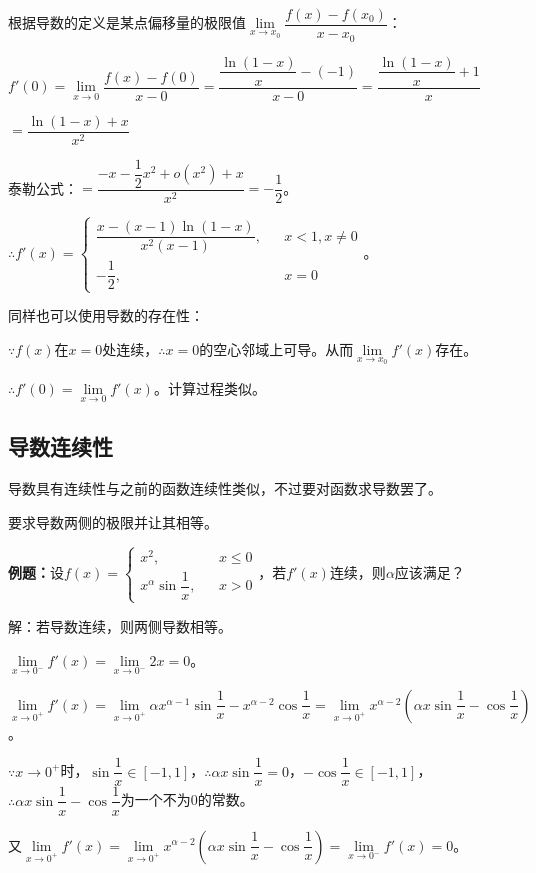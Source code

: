 \documentclass[UTF8, 12pt]{ctexart}
\begin{document}
根据导数的定义是某点偏移量的极限值$\lim\limits_{x\to x_0}\dfrac{f(x)-f(x_0)}{x-x_0}$：

$f'(0)=\lim\limits_{x\to 0}\dfrac{f(x)-f(0)}{x-0}=\dfrac{\dfrac{\ln(1-x)}{x}-(-1)}{x-0}=\dfrac{\dfrac{\ln(1-x)}{x}+1}{x}$\medskip

$=\dfrac{\ln(1-x)+x}{x^2}$

泰勒公式：$=\dfrac{-x-\dfrac{1}{2}x^2+o(x^2)+x}{x^2}=-\dfrac{1}{2}$。\medskip

$\therefore f'(x)=\left\{\begin{array}{lcl}
    \dfrac{x-(x-1)\ln(1-x)}{x^2(x-1)}, & & x<1,x\neq 0 \\
    -\dfrac{1}{2}, & & x=0
\end{array}
\right.$。\medskip

同样也可以使用导数的存在性：

$\because f(x)$在$x=0$处连续，$\therefore x=0$的空心邻域上可导。从而$\lim\limits_{x\to x_0}f'(x)$存在。

$\therefore f'(0)=\lim\limits_{x\to 0}f'(x)$。计算过程类似。

\subsection{导数连续性}

导数具有连续性与之前的函数连续性类似，不过要对函数求导数罢了。

要求导数两侧的极限并让其相等。\medskip

\textbf{例题：}设$f(x)=\left\{\begin{array}{lcl}
    x^2, & & x\leqslant 0 \\
    x^\alpha\sin\dfrac{1}{x}, & & x>0
\end{array}
\right.$，若$f'(x)$连续，则$\alpha$应该满足？ 

解：若导数连续，则两侧导数相等。

$\lim\limits_{x\to 0^-}f'(x)=\lim\limits_{x\to 0^-}2x=0$。

$\lim\limits_{x\to 0^+}f'(x)=\lim\limits_{x\to 0^+}\alpha x^{\alpha-1}\sin\dfrac{1}{x}-x^{\alpha-2}\cos\dfrac{1}{x}=\lim\limits_{x\to 0^+}x^{\alpha-2}\left(\alpha x\sin\dfrac{1}{x}-\cos\dfrac{1}{x}\right)$。

$\because x\to 0^+$时，$\sin\dfrac{1}{x}\in[-1,1]$，$\therefore\alpha x\sin\dfrac{1}{x}=0$，$-\cos\dfrac{1}{x}\in[-1,1]$，$\therefore \alpha x\sin\dfrac{1}{x}-\cos\dfrac{1}{x}$为一个不为0的常数。

又$\lim\limits_{x\to 0^+}f'(x)=\lim\limits_{x\to 0^+}x^{\alpha-2}\left(\alpha x\sin\dfrac{1}{x}-\cos\dfrac{1}{x}\right)=\lim\limits_{x\to 0^-}f'(x)=0$。
\end{document}

